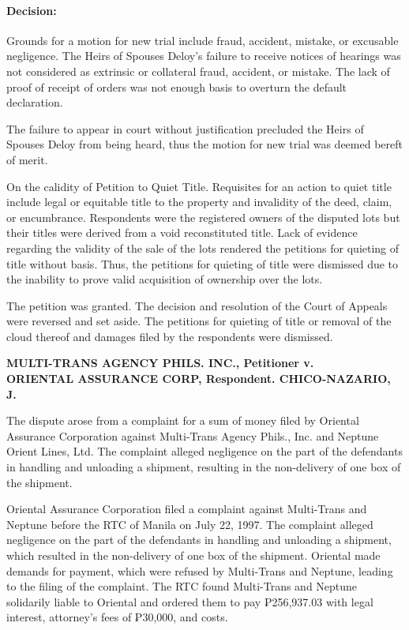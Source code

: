 \documentclass[
12pt,
oneside,
onehalfspacing,
headsepline
]{DigestCollection}
\begin{document}
\paragraph{Decision:}
\label{e24291d0-124d-11ef-aa24-9916ea601717}


Grounds for a motion for new trial include fraud, accident, mistake, or excusable negligence. The Heirs of Spouses Deloy's failure to receive notices of hearings was not considered as extrinsic or collateral fraud, accident, or mistake. The lack of proof of receipt of orders was not enough basis to overturn the default declaration.

The failure to appear in court without justification precluded the Heirs of Spouses Deloy from being heard, thus the motion for new trial was deemed bereft of merit.

On the calidity of Petition to Quiet Title. Requisites for an action to quiet title include legal or equitable title to the property and invalidity of the deed, claim, or encumbrance. Respondents were the registered owners of the disputed lots but their titles were derived from a void reconstituted title. Lack of evidence regarding the validity of the sale of the lots rendered the petitions for quieting of title without basis. Thus, the petitions for quieting of title were dismissed due to the inability to prove valid acquisition of ownership over the lots.

The petition was granted. The decision and resolution of the Court of Appeals were reversed and set aside. The petitions for quieting of title or removal of the cloud thereof and damages filed by the respondents were dismissed.

\label{c73c25d0-0a1a-11ef-932c-63c852f65e48}


\noindent\textbf{MULTI-TRANS AGENCY PHILS. INC., Petitioner v. \\ORIENTAL ASSURANCE CORP, Respondent. CHICO-NAZARIO, J.}\vspace{0.4cm}

The dispute arose from a complaint for a sum of money filed by Oriental Assurance Corporation against Multi-Trans Agency Phils., Inc. and Neptune Orient Lines, Ltd. The complaint alleged negligence on the part of the defendants in handling and unloading a shipment, resulting in the non-delivery of one box of the shipment.

Oriental Assurance Corporation filed a complaint against Multi-Trans and Neptune before the RTC of Manila on July 22, 1997. The complaint alleged negligence on the part of the defendants in handling and unloading a shipment, which resulted in the non-delivery of one box of the shipment. Oriental made demands for payment, which were refused by Multi-Trans and Neptune, leading to the filing of the complaint. The RTC found Multi-Trans and Neptune solidarily liable to Oriental and ordered them to pay ₱256,937.03 with legal interest, attorney's fees of ₱30,000, and costs.
\end{document}
